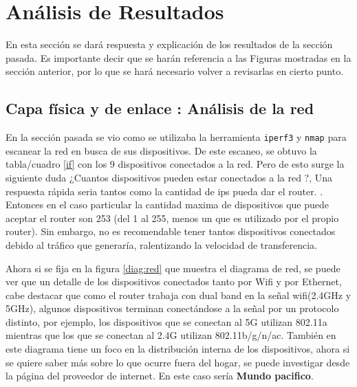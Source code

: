 \section{Análisis de Resultados}

En esta sección se dará respuesta y explicación de los resultados de la sección pasada. Es importante decir que se harán referencia a las Figuras mostradas en la sección anterior, por lo que se hará necesario volver a revisarlas en cierto punto. 

\subsection{Capa física y de enlace : Análisis de la red}

\noindent En la sección pasada se vio como se utilizaba la
herramienta \verb|iperf3| y \verb|nmap| para escanear la red en busca de sus dispositivos. De este escaneo, se obtuvo la tabla/cuadro \ref{if} con los 9 dispositivos conectados a la red. Pero de esto surge la siguiente duda ¿Cuantos dispositivos pueden estar conectados a la red ?, Una respuesta rápida seria tantos como la cantidad de ips pueda dar el router. \cite{maxMAC}. Entonces en el caso particular la cantidad maxima de dispositivos que puede aceptar el router son 253 (del 1 al 255, menos un que es utilizado por el propio router). Sin embargo, no es recomendable tener tantos dispositivos conectados debido al tráfico que generaría, ralentizando la velocidad de transferencia.
\newline

\noindent Ahora si se fija en la figura \ref{diag:red} que muestra el diagrama de red, se puede ver que un detalle de los dispositivos conectados tanto por Wifi y por Ethernet, cabe destacar que como el router trabaja con dual band en la señal wifi(2.4GHz y 5GHz), algunos dispositivos terminan conectándose a la señal por un protocolo distinto, por ejemplo, los dispositivos que se conectan al 5G utilizan 802.11a mientras que los que se conectan al 2.4G utilizan 802.11b/g/n/ac. También en este diagrama tiene un foco en la distribución interna de los dispositivos, ahora si se quiere saber más sobre lo que ocurre fuera del hogar, se puede investigar desde la página del proveedor de internet. En este caso sería \textbf{Mundo pacifico}.


